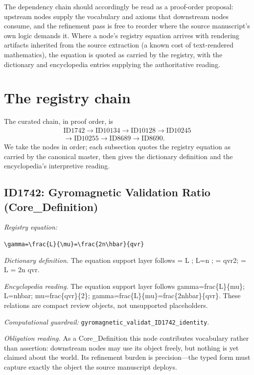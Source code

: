 \documentclass[11pt]{article}
\theoremstyle{remark}
\begin{document}
The dependency chain should accordingly be read as a proof-order proposal: upstream nodes supply the vocabulary and axioms that downstream nodes consume, and the refinement pass is free to reorder where the source manuscript's own logic demands it. Where a node's registry equation arrives with rendering artifacts inherited from the source extraction (a known cost of text-rendered mathematics), the equation is quoted as carried by the registry, with the dictionary and encyclopedia entries supplying the authoritative reading.

\section{The registry chain}
\label{sec:chain}

The curated chain, in proof order, is
\begin{equation*}
\begin{gathered}
\text{ID1742} \to \text{ID10134} \to \text{ID10128} \to \text{ID10245} \\
\to \text{ID10255} \to \text{ID8689} \to \text{ID8690}.
\end{gathered}
\end{equation*}
We take the nodes in order; each subsection quotes the registry equation as carried by the canonical master, then gives the dictionary definition and the encyclopedia's interpretive reading.

\subsection{ID1742: Gyromagnetic Validation Ratio (Core\_Definition)}

\noindent\textit{Registry equation:}\par
{\small\texttt{\textbackslash{}gamma=\textbackslash{}frac\{L\}\{\textbackslash{}mu\}=\textbackslash{}frac\{2n\textbackslash{}hbar\}\{qvr\}}}\par\medskip
\noindent\textit{Dictionary definition.} The equation support layer follows = L ; L=n ; = qvr2; = L = 2n qvr.\par\medskip
\noindent\textit{Encyclopedia reading.} The equation support layer follows gamma=frac\{L\}\{mu\}; L=nhbar; mu=frac\{qvr\}\{2\}; gamma=frac\{L\}\{mu\}=frac\{2nhbar\}\{qvr\}. These relations are compact review objects, not unsupported placeholders.
\par\medskip\noindent\textit{Computational guardrail:} \texttt{gyromagnetic\_validat\_ID1742\_identity}.
\par\medskip\noindent\textit{Obligation reading.} As a Core\_Definition this node contributes vocabulary rather than assertion: downstream nodes may use its object freely, but nothing is yet claimed about the world. Its refinement burden is precision---the typed form must capture exactly the object the source manuscript deploys.
\end{document}
